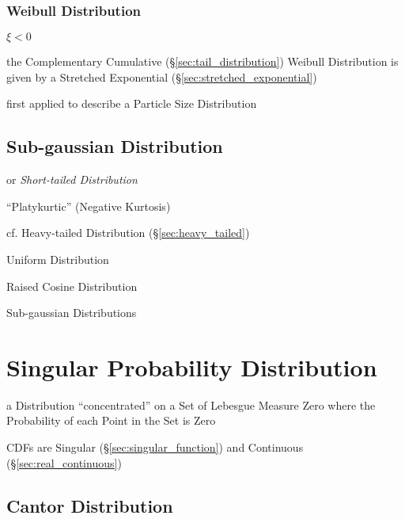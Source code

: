 \subsubsection{Weibull Distribution}\label{sec:weibull_distribution}

$\xi < 0$

the Complementary Cumulative (\S\ref{sec:tail_distribution}) Weibull
Distribution is given by a Stretched Exponential
(\S\ref{sec:stretched_exponential})

first applied to describe a Particle Size Distribution



\subsection{Sub-gaussian Distribution}\label{sec:sub_gaussian}

or \emph{Short-tailed Distribution}

``Platykurtic'' (Negative Kurtosis)

cf. Heavy-tailed Distribution (\S\ref{sec:heavy_tailed})

Uniform Distribution

Raised Cosine Distribution

Sub-gaussian Distributions



\section{Singular Probability Distribution}\label{sec:singular_distribution}

a Distribution ``concentrated'' on a Set of Lebesgue Measure Zero where
the Probability of each Point in the Set is Zero

CDFs are Singular (\S\ref{sec:singular_function}) and Continuous
(\S\ref{sec:real_continuous})



\subsection{Cantor Distribution}\label{sec:cantor_distribution}

